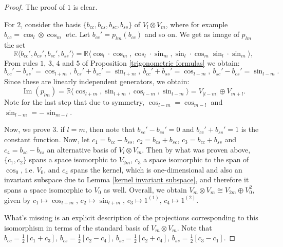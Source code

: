 \documentclass[12pt, a4paper]{article}
\theoremstyle{plain}
\theoremstyle{definition}
\theoremstyle{remark}
\newcommand{\R}{\mathds{R}}
\DeclareMathOperator{\im}{Im}
\begin{document}
\begin{proof}
The proof of $1$ is clear.

For $2$, consider the basis $\{b_{cc}, b_{cs}, b_{sc}, b_{ss}\}$ of $V_{l} \otimes V_m$, where for example $b_{cc} = \cos_l \otimes \cos_m$ etc. Let $b_{cc}' = p_{lm}(b_{cc})$ and so on. We get as image of $p_{lm}$ the set
\begin{equation*}
\R \langle b_{cc}', b_{cs}', b_{sc}', b_{ss}' \rangle  = \R\langle \cos_l \cdot \cos_m, \cos_l \cdot \sin_m, \sin_l \cdot \cos_m \sin_l \cdot \sin_m\rangle,
\end{equation*}
From rules $1$, $3$, $4$ and $5$ of Proposition \ref{trigonometric formulas} we obtain:
\begin{equation*}
b_{cc}' - b_{ss}' = \cos_{l+m}, \ b_{cs}' + b_{sc}' = \sin_{l+m}, \ b_{cc}' + b_{ss}' = \cos_{l-m}, \ b_{sc}' - b_{cs}' = \sin_{l-m}.
\end{equation*}
Since these are linearly independent generators, we obtain:
\begin{equation*}
\im(p_{lm}) = \R \langle \cos_{l+m}, \sin_{l+m}, \cos_{l-m}, \sin_{l-m}\rangle = V_{|l-m|} \oplus V_{m+l} .
\end{equation*}
Note for the last step that due to symmetry, $\cos_{l-m} = \cos_{m-l}$ and $\sin_{l-m} = - \sin_{m-l}$.

Now, we prove $3$. if $l = m$, then note that $b_{sc}' - b_{cs}' = 0$ and $b_{cc}' + b_{ss}' = 1$ is the constant function. Now, let $c_1 = b_{cc} - b_{ss}$, $c_{2} = b_{cs} + b_{sc}$, $c_3 = b_{cc} + b_{ss}$ and $c_4 = b_{sc} - b_{cs}$ an alternative basis of $V_l \otimes V_m$. Then by what was proven above, $\{c_1, c_2\}$ spans a space isomorphic to $V_{2m}$, $c_3$ a space isomorphic to the span of $\cos_0$, i.e. $V_0$, and $c_4$ spans the kernel, which is one-dimensional and also an invariant subspace due to Lemma \ref{kernel invariant subspace}, and therefore it spans a space isomorphic to $V_0$ as well. Overall, we obtain $V_m \otimes V_m \cong V_{2m} \oplus V_0^2$, given by $c_1 \mapsto \cos_{l+m}$, $c_2 \mapsto \sin_{l+m}$, $c_3 \mapsto {1^{(1)}}$, $c_4 \mapsto 1^{(2)}$.

What's missing is an explicit description of the projections corresponding to this isomorphism in terms of the standard basis of $V_m \otimes V_m$. Note that $b_{cc} = \frac{1}{2} \left[ c_1 + c_3\right]$, $b_{cs} = \frac{1}{2} \left[ c_2 - c_4\right]$, $b_{sc} = \frac{1}{2} \left[ c_2 + c_4 \right]$, $b_{ss} = \frac{1}{2} \left[ c_3 - c_1\right]$.


\end{proof}
\end{document}

